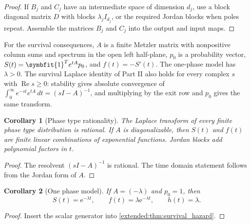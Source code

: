 \documentclass[11pt,letterpaper]{article}
\theoremstyle{plain}
\theoremstyle{plain}
\theoremstyle{plain}
\newtheorem{corollary}[corollary]{Corollary}
\theoremstyle{definition}
\theoremstyle{definition}
\theoremstyle{definition}
\theoremstyle{definition}
\theoremstyle{definition}
\theoremstyle{remark}
\theoremstyle{remark}
\theoremstyle{remark}
\theoremstyle{remark}
\theoremstyle{remark}
\theoremstyle{remark}
\newcommand{\e}{\mathrm e}
\newcommand{\one}{\bm 1}
\providecommand{\bm}[1]{\symbfit{#1}}
\let\KomorebiPrimitivemathrm\mathrm
\renewcommand{\mathrm}[1]{{\KomorebiPrimitivemathrm{#1}}}
\begin{document}
\begin{proof}
If \(B_j\) and \(C_j\) have an intermediate space of dimension \(d_j\), use a block diagonal matrix \(D\) with blocks \(\lambda_j I_{d_j}\), or the required Jordan blocks when poles repeat. Assemble the matrices \(B_j\) and \(C_j\) into the output and input maps.
\end{proof}


For the survival consequences, $A$ is a finite Metzler matrix with nonpositive column sums and spectrum in the open left half-plane, $p_0$ is a probability vector, $S(t)=\one^T e^{tA}p_0$, and $f(t)=-S'(t)$. The one-phase model has $\lambda>0$. The survival Laplace identity of Part II also holds for every complex $s$ with $\operatorname{Re}s\geq0$: stability gives absolute convergence of $\int_0^\infty e^{-st}e^{tA}\,dt=(sI-A)^{-1}$, and multiplying by the exit row and $p_0$ gives the same transform.
\begin{corollary}[Phase type rationality]\label{earlier:record:024}\label{earlier:cor:phase_type_rationality}
The Laplace transform of every finite phase type distribution is rational. If \(A\) is diagonalizable, then \(S(t)\) and \(f(t)\) are finite linear combinations of exponential functions. Jordan blocks add polynomial factors in \(t\).
\end{corollary}

\begin{proof}
The resolvent \((sI-A)^{-1}\) is rational. The time domain statement follows from the Jordan form of \(A\).
\end{proof}

\begin{corollary}[One phase model]\label{earlier:record:025}\label{earlier:cor:one_phase_model}
If \(A=(-\lambda)\) and \(p_0=1\), then
\[
S(t)=\e^{-\lambda t},
\qquad
f(t)=\lambda\e^{-\lambda t},
\qquad
h(t)=\lambda.
\]
\end{corollary}

\begin{proof}
Insert the scalar generator into \cref{extended:thm:survival_hazard}.
\end{proof}


\FloatBarrier
\end{document}
